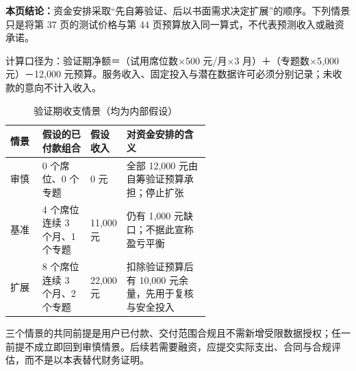 \textbf{本页结论：}资金安排采取“先自筹验证、后以书面需求决定扩展”的顺序。下列情景只是将第 37 页的测试价格与第 44 页预算放入同一算式，不代表预测收入或融资承诺。

计算口径为：验证期净额＝（试用席位数×500 元/月×3 月）＋（专题数×5,000 元）－12,000 元预算。服务收入、固定投入与潜在数据许可必须分别记录；未收款的意向不计入收入。

\begin{table}[htbp]
\centering
\caption{验证期收支情景（均为内部假设）}
\label{tab:wty-finance-scenarios}
\small
\begin{tabularx}{\linewidth}{p{0.16\linewidth}p{0.24\linewidth}p{0.18\linewidth}X}
\toprule
情景 & 假设的已付款组合 & 假设收入 & 对资金安排的含义 \\
\midrule
审慎 & 0 个席位、0 个专题 & 0 元 & 全部 12,000 元由自筹验证预算承担；停止扩张 \\
基准 & 4 个席位连续 3 个月、1 个专题 & 11,000 元 & 仍有 1,000 元缺口；不据此宣称盈亏平衡 \\
扩展 & 8 个席位连续 3 个月、2 个专题 & 22,000 元 & 扣除验证预算后有 10,000 元余量，先用于复核与安全投入 \\
\bottomrule
\end{tabularx}
\end{table}

三个情景的共同前提是用户已付款、交付范围合规且不需新增受限数据授权；任一前提不成立即回到审慎情景。后续若需要融资，应提交实际支出、合同与合规评估，而不是以本表替代财务证明。
